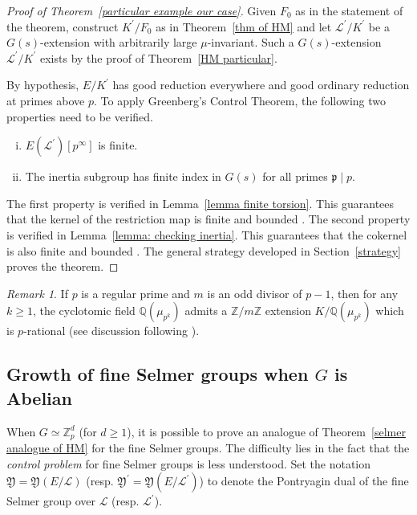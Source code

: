 \documentclass{amsart}
\DeclareMathOperator{\Gal}{Gal}
\newcommand{\QQ}{\mathbb Q}
\newcommand{\ZZ}{\mathbb Z}
\newcommand{\fp}{\mathfrak p}
\newcommand{\Linf}{\mathcal{L}}
\newcommand{\Y}{\mathfrak Y}
\theoremstyle{definition}
\theoremstyle{remark}
\newtheorem{rem}[Th]{Remark}
\begin{document}
\begin{proof}[Proof of Theorem~\ref{particular example our case}]
Given $F_0$ as in the statement of the theorem, construct $K^\prime/F_0$ as in Theorem~\ref{thm of HM} and let $\Linf^\prime/K^\prime$ be a $G(s)$-extension with arbitrarily large $\mu$-invariant.
Such a $G(s)$-extension $\Linf^\prime/K^\prime$ exists by the proof of Theorem~\ref{HM particular}.

By hypothesis, $E/K^\prime$ has good reduction everywhere and good ordinary reduction at primes above $p$.
To apply Greenberg's Control Theorem, the following two properties need to be verified.
\begin{enumerate}[(i)] 
\item $E(\Linf^\prime)[p^\infty]$ is finite.
\item The inertia subgroup has finite index in $G(s)$ for all primes $\fp \mid p$.
\end{enumerate}  
 
The first property is verified in Lemma~\ref{lemma finite torsion}.
This guarantees that the kernel of the restriction map is finite and bounded \cite[Proposition 3.1]{Gre03}. 
The second property is verified in Lemma~\ref{lemma: checking inertia}.
This guarantees that the cokernel is also finite and bounded \cite[Proposition 4.4]{Gre03}.
The general strategy developed in Section~\ref{strategy} proves the theorem.
\end{proof}

\begin{rem}
If $p$ is a regular prime and $m$ is an odd divisor of $p-1$, then for any $k\geq 1$, the cyclotomic field $\QQ(\mu_{p^k})$ admits a $\ZZ/m\ZZ$ extension $K/\QQ(\mu_{p^k})$ which is $p$-rational (see discussion following \cite[Theorem 1.1]{HM19}).
\end{rem}

\subsection{Growth of fine Selmer groups when $G$ is Abelian}
When $G\simeq \ZZ_p^d$ (for $d\geq 1$), it is possible to prove an analogue of Theorem~\ref{selmer analogue of HM} for the fine Selmer groups.
The difficulty lies in the fact that the \textit{control problem} for fine Selmer groups is less understood.
Set the notation $\Y=\Y(E/\Linf)$ (resp. $\Y^\prime=\Y(E/\Linf^\prime)$) to denote the Pontryagin dual of the fine Selmer group over $\Linf$ (resp. $\Linf^\prime$).
\end{document}
